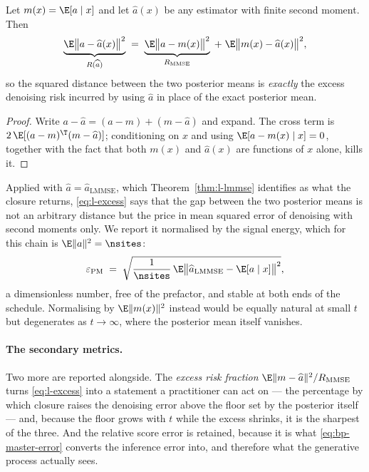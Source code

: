 \begin{proposition}\label{prop:l-excess}
Let $m(x) = \E[a\mid x]$ and let $\widehat a(x)$ be any estimator with finite
second moment. Then
\begin{equation}
  \underbrace{\E\big\|a - \widehat a(x)\big\|^2}_{R(\widehat a)}
  \;=\;
  \underbrace{\E\big\|a - m(x)\big\|^2}_{R_{\mathrm{MMSE}}}
  \;+\;
  \E\big\|m(x) - \widehat a(x)\big\|^2 ,
  \label{eq:l-excess}
\end{equation}
so the squared distance between the two posterior means is \emph{exactly} the
excess denoising risk incurred by using $\widehat a$ in place of the exact
posterior mean.
\end{proposition}

\begin{proof}
Write $a - \widehat a = (a - m) + (m - \widehat a)$ and expand. The cross term
is $2\,\E[(a-m)^\T(m-\widehat a)]$; conditioning on $x$ and using
$\E[a - m(x) \mid x] = 0$, together with the fact that both $m(x)$ and
$\widehat a(x)$ are functions of $x$ alone, kills it. \end{proof}

Applied with $\widehat a = \widehat a_{\mathrm{LMMSE}}$, which
Theorem~\ref{thm:l-lmmse} identifies as what the closure returns,
\eqref{eq:l-excess} says that the gap between the two posterior means is not
an arbitrary distance but the price in mean squared error of denoising with
second moments only. We report it normalised by the signal energy, which for
this chain is $\E\|a\|^2 = \nsites$:
\begin{equation}
  \varepsilon_{\mathrm{PM}}
  \;=\;
  \sqrt{\frac{1}{\nsites}\,
        \E\big\| \widehat a_{\mathrm{LMMSE}} - \E[a \mid x] \big\|^2 } ,
  \label{eq:l-epspm}
\end{equation}
a dimensionless number, free of the prefactor, and stable at both ends
of the schedule. Normalising by $\E\|m(x)\|^2$ instead would be equally
natural at small $t$ but degenerates as $t\to\infty$, where the posterior mean
itself vanishes.

\paragraph{The secondary metrics.} Two more are reported alongside. The
\emph{excess risk fraction} $\E\|m - \widehat a\|^2 / R_{\mathrm{MMSE}}$ turns
\eqref{eq:l-excess} into a statement a practitioner can act on --- the
percentage by which closure raises the denoising error above the floor set by
the posterior itself --- and, because the floor grows with $t$ while the excess
shrinks, it is the sharpest of the three. And the relative score error is
retained, because it is what \eqref{eq:bp-master-error} converts the inference
error into, and therefore what the generative process actually sees.

